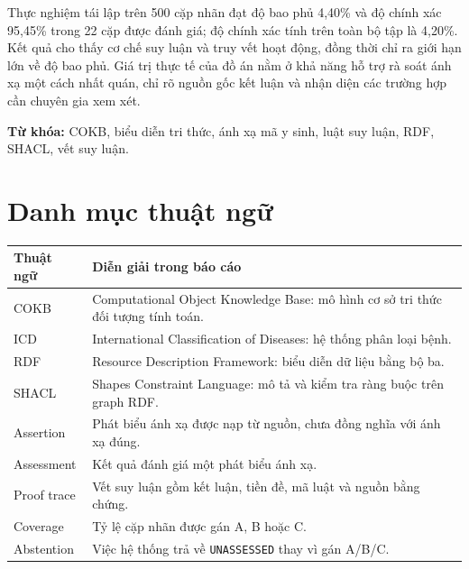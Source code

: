 \documentclass[12pt,a4paper,oneside]{report}
\newcommand{\Unassessed}{\texttt{UNASSESSED}}
\begin{document}
Thực nghiệm tái lập trên 500 cặp nhãn đạt độ bao phủ 4,40\% và độ chính xác
95,45\% trong 22 cặp được đánh giá; độ chính xác tính trên toàn bộ tập là
4,20\%. Kết quả cho thấy cơ chế suy luận và truy vết hoạt động, đồng thời
chỉ ra giới hạn lớn về độ bao phủ. Giá trị thực tế của đồ án nằm ở khả năng
hỗ trợ rà soát ánh xạ một cách nhất quán, chỉ rõ nguồn gốc kết luận và
nhận diện các trường hợp cần chuyên gia xem xét.

\noindent\textbf{Từ khóa:} COKB, biểu diễn tri thức, ánh xạ mã y sinh,
luật suy luận, RDF, SHACL, vết suy luận.
\tableofcontents
\listoffigures
\listoftables
\chapter*{Danh mục thuật ngữ}
\begin{tabularx}{\textwidth}{lY}
\toprule
Thuật ngữ & Diễn giải trong báo cáo\\
\midrule
COKB & Computational Object Knowledge Base: mô hình cơ sở tri thức đối tượng tính toán.\\
ICD & International Classification of Diseases: hệ thống phân loại bệnh.\\
RDF & Resource Description Framework: biểu diễn dữ liệu bằng bộ ba.\\
SHACL & Shapes Constraint Language: mô tả và kiểm tra ràng buộc trên graph RDF.\\
Assertion & Phát biểu ánh xạ được nạp từ nguồn, chưa đồng nghĩa với ánh xạ đúng.\\
Assessment & Kết quả đánh giá một phát biểu ánh xạ.\\
Proof trace & Vết suy luận gồm kết luận, tiền đề, mã luật và nguồn bằng chứng.\\
Coverage & Tỷ lệ cặp nhãn được gán A, B hoặc C.\\
Abstention & Việc hệ thống trả về \Unassessed{} thay vì gán A/B/C.\\
\bottomrule
\end{tabularx}
\clearpage
{}






\appendix

\clearpage
{}
{}

\end{document}
